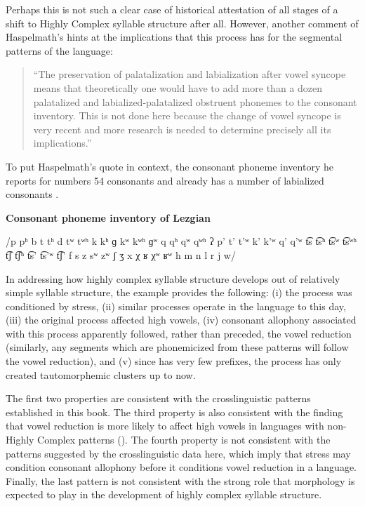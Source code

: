 Perhaps this is not such a clear case of historical attestation of all stages of a shift to Highly Complex syllable structure after all. However, another comment of Haspelmath’s hints at the implications that this process has for the segmental patterns of the language:

\begin{quote}
“The preservation of palatalization and labialization after vowel syncope means that theoretically one would have to add more than a dozen palatalized and labialized-palatalized obstruent phonemes to the consonant inventory. This is not done here because the change of vowel syncope is very recent and more research is needed to determine precisely all its implications.”
\citep[38]{Haspelmath1993}
\end{quote}

To put Haspelmath’s quote in context, the consonant phoneme inventory he reports for  numbers 54 consonants and already has a number of labialized consonants .

\ea\label{ex:8.4}
  \textbf{Consonant phoneme inventory of Lezgian}

/p pʰ b t tʰ d tʷ tʷʰ k kʰ ɡ kʷ kʷʰ ɡʷ q qʰ qʷ qʷʰ ʔ p’ t’ t’ʷ k’ k’ʷ q’ q’ʷ t͡s t͡sʰ t͡sʷ t͡sʷʰ t͡ʃ t͡ʃʰ t͡s’ t͡s’ʷ t͡ʃ’ f s z sʷ zʷ ʃ ʒ x χ ʁ χʷ ʁʷ h m n l r j w/
\z

  In addressing how highly complex syllable structure develops out of relatively simple syllable structure, the  example provides the following: (i) the process was conditioned by stress, (ii) similar processes operate in the language to this day, (iii) the original process affected high vowels, (iv) consonant allophony associated with this process apparently followed, rather than preceded, the vowel reduction (similarly, any segments which are phonemicized from these patterns will follow the vowel reduction), and (v) since  has very few prefixes, the process has only created tautomorphemic clusters up to now. 

  The first two properties are consistent with the crosslinguistic patterns established in this book. The third property is also consistent with the finding that vowel reduction is more likely to affect high vowels in languages with non-Highly Complex patterns (). The fourth property is not consistent with the patterns suggested by the crosslinguistic data here, which imply that stress may condition consonant allophony before it conditions vowel reduction in a language. Finally, the last pattern is not consistent with the strong role that morphology is expected to play in the development of highly complex syllable structure.


